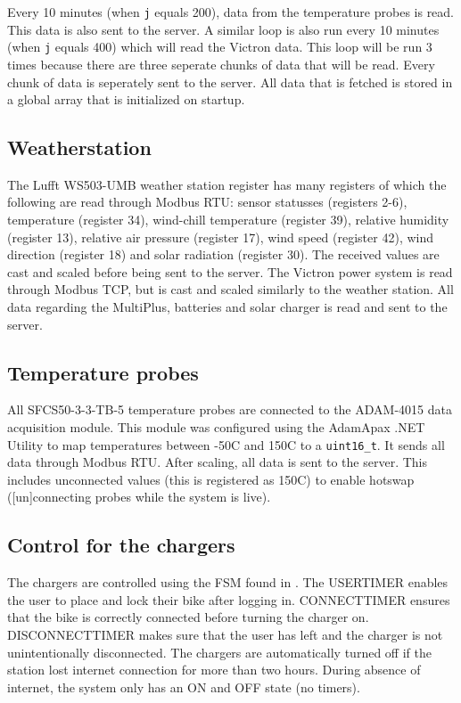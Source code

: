 Every 10 minutes (when \verb|j| equals 200), data from the temperature probes is read. This data is also sent to the server. A similar loop is also run every 10 minutes (when \verb|j| equals 400) which will read the Victron data. This loop will be run 3 times because there are three seperate chunks of data that will be read. Every chunk of data is seperately sent to the server. All data that is fetched is stored in a global array that is initialized on startup.\\

\subsection{Weatherstation}
The Lufft WS503-UMB weather station register has many registers of which the following are read through Modbus RTU: sensor statusses (registers 2-6), temperature (register 34), wind-chill temperature (register 39), relative humidity (register 13), relative air pressure (register 17), wind speed (register 42), wind direction (register 18) and solar radiation (register 30). The received values are cast and scaled before being sent to the server. The Victron power system is read through Modbus TCP, but is cast and scaled similarly to the weather station. All data regarding the MultiPlus, batteries and solar charger is read and sent to the server.\\

\subsection{Temperature probes}
All SFCS50-3-3-TB-5 temperature probes are connected to the ADAM-4015 data acquisition module. This module was configured using the AdamApax .NET Utility to map temperatures between -50\degree C and 150\degree C to a \verb|uint16_t|. It sends all data through Modbus RTU. After scaling, all data is sent to the server. This includes unconnected values (this is registered as 150\degree C) to enable hotswap ([un]connecting probes while the system is live).\\

\subsection{Control for the chargers}
The chargers are controlled using the FSM found in . The USERTIMER enables the user to place and lock their bike after logging in. CONNECTTIMER ensures that the bike is correctly connected before turning the charger on. DISCONNECTTIMER makes sure that the user has left and the charger is not unintentionally disconnected. The chargers are automatically turned off if the station lost internet connection for more than two hours. During absence of internet, the system only has an ON and OFF state (no timers).\\

